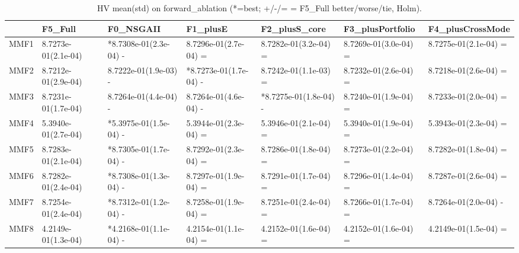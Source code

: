 \begin{table}[t]
\centering
\caption{HV mean(std) on forward_ablation (*=best; +/-/= = F5_Full better/worse/tie, Holm).}
\label{tab:forward_ablation_HV}
\begin{tabular}{lllllll}
\toprule
 & F5\_Full & F0\_NSGAII & F1\_plusE & F2\_plusS\_core & F3\_plusPortfolio & F4\_plusCrossMode \\
\midrule
MMF1 & 8.7273e-01(2.1e-04) & *8.7308e-01(2.3e-04) - & 8.7296e-01(2.7e-04) = & 8.7282e-01(3.2e-04) = & 8.7269e-01(3.0e-04) = & 8.7275e-01(2.1e-04) = \\
MMF2 & 8.7212e-01(2.9e-04) & 8.7222e-01(1.9e-03) - & *8.7273e-01(1.7e-04) - & 8.7242e-01(1.1e-03) = & 8.7232e-01(2.6e-04) = & 8.7218e-01(2.6e-04) = \\
MMF3 & 8.7231e-01(1.7e-04) & 8.7264e-01(4.4e-04) - & 8.7264e-01(4.6e-04) - & *8.7275e-01(1.8e-04) - & 8.7240e-01(1.9e-04) = & 8.7233e-01(2.0e-04) = \\
MMF4 & 5.3940e-01(2.7e-04) & *5.3975e-01(1.5e-04) - & 5.3944e-01(2.3e-04) = & 5.3946e-01(2.1e-04) = & 5.3940e-01(1.9e-04) = & 5.3943e-01(2.3e-04) = \\
MMF5 & 8.7283e-01(2.1e-04) & *8.7305e-01(1.7e-04) - & 8.7292e-01(2.3e-04) = & 8.7286e-01(1.8e-04) = & 8.7273e-01(2.2e-04) = & 8.7282e-01(1.8e-04) = \\
MMF6 & 8.7282e-01(2.4e-04) & *8.7308e-01(1.3e-04) - & 8.7297e-01(1.9e-04) = & 8.7291e-01(1.7e-04) = & 8.7296e-01(1.4e-04) = & 8.7287e-01(2.6e-04) = \\
MMF7 & 8.7254e-01(2.4e-04) & *8.7312e-01(1.2e-04) - & 8.7258e-01(1.9e-04) = & 8.7251e-01(2.4e-04) = & 8.7266e-01(1.7e-04) = & 8.7264e-01(2.0e-04) - \\
MMF8 & 4.2149e-01(1.3e-04) & *4.2168e-01(1.1e-04) - & 4.2154e-01(1.1e-04) = & 4.2152e-01(1.6e-04) = & 4.2152e-01(1.6e-04) = & 4.2149e-01(1.5e-04) = \\
\bottomrule
\end{tabular}
\end{table}
